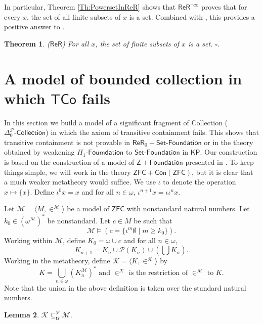 \documentclass[11pt, a4paper]{article}
\newcounter{Def1}
\newcounter{Prop1}
\newcounter{Theor1}
\newtheorem{theorem}{Theorem}[section]
\newtheorem{lemma}[theorem]{Lemma}
\begin{document}
In particular, Theorem \ref{Th:PowersetInReR} shows that $\mathsf{ReR}^{\neg \infty}$ proves that for every $x$, the set of all finite subsets of $x$ is a set. Combined with \cite[Proposition 2.103]{mat06}, this provides a positive answer to \cite[Problem 8.26]{mat06}.

\begin{theorem}
($\mathsf{ReR}$) For all $x$, the set of finite subsets of $x$ is a set. \hfill$\square$.
\end{theorem}  


\section[Model in which TCo fails]{A model of bounded collection in which $\mathsf{TCo}$ fails} \label{Sec:ModelInWhichTCoFails}

In this section we build a model of a significant fragment of \textsf{Collection} ($\Delta_0^{\mathcal{P}}\textsf{-Collection}$) in which the axiom of transitive containment fails. This shows that transitive containment is not provable in $\mathsf{ReR}_0+\textsf{Set-Foundation}$ or in the theory obtained by weakening $\Pi_1\textsf{-Foumdation}$ to $\textsf{Set-Foundation}$ in $\mathsf{KP}$. Our construction is based on the construction of a model of $\mathsf{Z}+\textsf{Foundation}$ presented in \cite[\S 12]{mat06}. To keep things simple, we will work in the theory $\mathsf{ZFC}+\mathsf{Con}(\mathsf{ZFC})$, but it is clear that a much weaker metatheory would suffice. We use $\iota$ to denote the operation $x \mapsto \{x\}$. Define $\iota^0 x= x$ and for all $n \in \omega$, $\iota^{n+1} x= \iota \iota^n x$.

Let $\mathcal{M}= \langle M, \in^{\mathcal{M}} \rangle$ be a model of $\mathsf{ZFC}$ with nonstandard natural numbers. Let $k_0 \in (\omega^{\mathcal{M}})^*$ be nonstandard. Let $c \in M$ be such that
\[
\mathcal{M} \models (c= \{\iota^m \emptyset \mid m \geq k_0\}).
\]
Working within $\mathcal{M}$, define $K_0= \omega \cup c$ and for all $n \in \omega$,
\[
K_{n+1}= K_n\cup \mathcal{P}(K_n) \cup \left(\bigcup K_n \right).
\]
Working in the metatheory, define $\mathcal{K}= \langle K, \in^{\mathcal{K}}\rangle$ by
\[
K= \bigcup_{n \in \omega} (K_n^{\mathcal{M}})^* \textrm{ and } \in^{\mathcal{K}} \textrm{ is the restriction of } \in^{\mathcal{M}} \textrm{ to } K.
\]
Note that the union in the above definition is taken over the standard natural numbers.

\begin{lemma} \label{Th:KSuperTransitiveSubstructure}
$\mathcal{K} \subseteq_{\mathsf{tr}}^{\mathcal{P}} \mathcal{M}$.
\end{lemma} 
\end{document}
